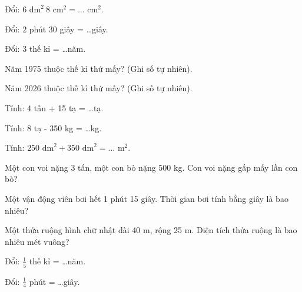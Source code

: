 \begin{ex}
Đổi: $6\text{ dm}^2\ 8\text{ cm}^2 = \dots\text{ cm}^2$.
\end{ex}

\begin{ex}
Đổi: 2 phút 30 giây = \dots giây.
\end{ex}

\begin{ex}
Đổi: 3 thế kỉ = \dots năm.
\end{ex}

\begin{ex}
Năm 1975 thuộc thế kỉ thứ mấy? (Ghi số tự nhiên).
\end{ex}

\begin{ex}
Năm 2026 thuộc thế kỉ thứ mấy? (Ghi số tự nhiên).
\end{ex}

\begin{ex}
Tính: 4 tấn + 15 tạ = \dots tạ.
\end{ex}

\begin{ex}
Tính: 8 tạ - 350 kg = \dots kg.
\end{ex}

\begin{ex}
Tính: $250\text{ dm}^2 + 350\text{ dm}^2 = \dots\text{ m}^2$.
\end{ex}

\begin{ex}
Một con voi nặng 3 tấn, một con bò nặng 500 kg. Con voi nặng gấp mấy lần con bò?
\end{ex}

\begin{ex}
Một vận động viên bơi hết 1 phút 15 giây. Thời gian bơi tính bằng giây là bao nhiêu?
\end{ex}

\begin{ex}
Một thửa ruộng hình chữ nhật dài 40 m, rộng 25 m. Diện tích thửa ruộng là bao nhiêu mét vuông?
\end{ex}

\begin{ex}
Đổi: $\frac{1}{5}$ thế kỉ = \dots năm.
\end{ex}

\begin{ex}
Đổi: $\frac{1}{4}$ phút = \dots giây.
\end{ex}

